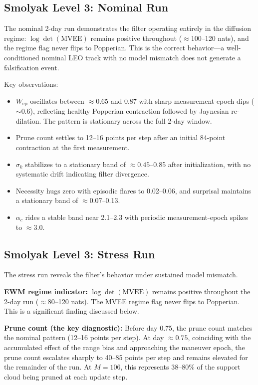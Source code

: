 \documentclass[12pt]{article}
\begin{document}
\subsection{Smolyak Level 3: Nominal Run}

The nominal 2-day run demonstrates the filter operating entirely in the diffusion regime: $\log\det(\mathrm{MVEE})$ remains positive throughout ($\approx 100$--120 nats), and the regime flag never flips to Popperian. This is the correct behavior---a well-conditioned nominal LEO track with no model mismatch does not generate a falsification event.

Key observations:
\begin{itemize}
\item $W_\mathrm{ep}$ oscillates between $\approx 0.65$ and $0.87$ with sharp measurement-epoch dips ($\sim 0.6$), reflecting healthy Popperian contraction followed by Jaynesian re-dilation. The pattern is stationary across the full 2-day window.
\item Prune count settles to 12--16 points per step after an initial 84-point contraction at the first measurement.
\item $\sigma_k$ stabilizes to a stationary band of $\approx 0.45$--0.85 after initialization, with no systematic drift indicating filter divergence.
\item Necessity hugs zero with episodic flares to 0.02--0.06, and surprisal maintains a stationary band of $\approx 0.07$--0.13.
\item $\alpha_c$ rides a stable band near 2.1--2.3 with periodic measurement-epoch spikes to $\approx 3.0$.
\end{itemize}

\subsection{Smolyak Level 3: Stress Run}

The stress run reveals the filter's behavior under sustained model mismatch.

\textbf{EWM regime indicator:} $\log\det(\mathrm{MVEE})$ remains positive throughout the 2-day run ($\approx 80$--120 nats). The MVEE regime flag never flips to Popperian. This is a significant finding discussed below.

\textbf{Prune count (the key diagnostic):} Before day 0.75, the prune count matches the nominal pattern (12--16 points per step). At day $\approx 0.75$, coinciding with the accumulated effect of the range bias and approaching the maneuver epoch, the prune count escalates sharply to 40--85 points per step and remains elevated for the remainder of the run. At $M = 106$, this represents 38--80\% of the support cloud being pruned at each update step.
\end{document}
